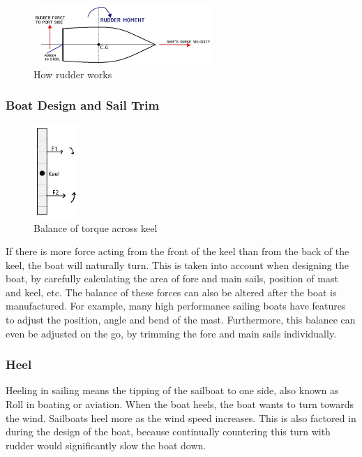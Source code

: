 \documentclass[12pt,twoside]{report}
\begin{document}
\begin{figure}[h]
\centering
\includegraphics[width = 0.6\textwidth]{figures/sailing/rudder.jpg}
\caption{How rudder works \cite{rudder}}
\label{fig:rudders}
\end{figure}

\subsubsection{Boat Design and Sail Trim}

\begin{figure}
\vspace{-1cm}
\centering
\includegraphics[width = 0.15\textwidth]{figures/sailing/tork.jpg}
\caption{Balance of torque across keel}
\label{fig:keel-tork}
\end{figure}

If there is more force acting from the front of the keel than from the back of the keel, the boat will naturally turn. This is taken into account when designing the boat, by carefully calculating the area of fore and main sails, position of mast and keel, etc. The balance of these forces can also be altered after the boat is manufactured. For example, many high performance sailing boats have features to adjust the position, angle and bend of the mast. Furthermore, this balance can even be adjusted on the go, by trimming the fore and main sails individually.

\subsubsection{Heel}
Heeling in sailing means the tipping of the sailboat to one side, also known as Roll in boating or aviation. When the boat heels, the boat wants to turn towards the wind. Sailboats heel more as the wind speed increases. This is also factored in during the design of the boat, because continually countering this turn with rudder would significantly slow the boat down.
\end{document}
